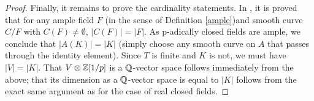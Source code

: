 \begin{theorem}
\begin{proof}
Finally, it remains to prove the cardinality statements. In \cite{pop2010henselian}, it is proved that for any ample field $F$ (in the sense of Definition \ref{ample})and smooth curve $C/F$ with $C(F)\neq\emptyset$, $|C(F)|=|F|$. As p-adically closed fields are ample, we conclude that $|A(K)|=|K|$ (simply choose any smooth curve on $A$ that passes through the identity element). Since $T$ is finite and $K$ is not, we must have $|V|=|K|$. That $V\otimes \mathbb{Z}[1/p]$ is a $\mathbb{Q}$-vector space follows immediately from the above; that its dimension as a $\mathbb{Q}$-vector space is equal to $|K|$ follows from the exact same argument as for the case of real closed fields.
\end{proof}
\end{theorem}


